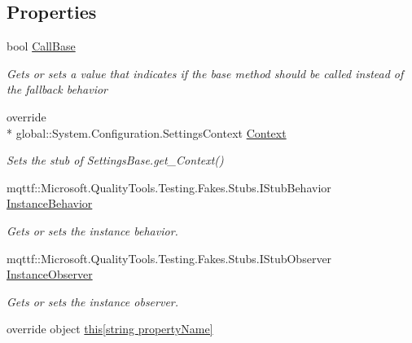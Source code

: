 \subsection*{Properties}
\begin{DoxyCompactItemize}
\item 
bool \hyperlink{class_system_1_1_configuration_1_1_fakes_1_1_stub_settings_base_a5e6f77066f1b9b35051130f2797a5ac5}{Call\-Base}
\begin{DoxyCompactList}\small\item\em Gets or sets a value that indicates if the base method should be called instead of the fallback behavior\end{DoxyCompactList}\item 
override \\*
global\-::\-System.\-Configuration.\-Settings\-Context \hyperlink{class_system_1_1_configuration_1_1_fakes_1_1_stub_settings_base_a3e1811dd1d27f7d4c11fbad319ac5613}{Context}
\begin{DoxyCompactList}\small\item\em Sets the stub of Settings\-Base.\-get\-\_\-\-Context()\end{DoxyCompactList}\item 
mqttf\-::\-Microsoft.\-Quality\-Tools.\-Testing.\-Fakes.\-Stubs.\-I\-Stub\-Behavior \hyperlink{class_system_1_1_configuration_1_1_fakes_1_1_stub_settings_base_a6afcb7bc15b19e7b93850309828bb37b}{Instance\-Behavior}
\begin{DoxyCompactList}\small\item\em Gets or sets the instance behavior.\end{DoxyCompactList}\item 
mqttf\-::\-Microsoft.\-Quality\-Tools.\-Testing.\-Fakes.\-Stubs.\-I\-Stub\-Observer \hyperlink{class_system_1_1_configuration_1_1_fakes_1_1_stub_settings_base_a2168de50e811a8fe9ba458c95aab3583}{Instance\-Observer}
\begin{DoxyCompactList}\small\item\em Gets or sets the instance observer.\end{DoxyCompactList}\item 
override object \hyperlink{class_system_1_1_configuration_1_1_fakes_1_1_stub_settings_base_aa3c6d027c46a09cebc0e32fcc5739575}{this\mbox{[}string property\-Name\mbox{]}}

\end{DoxyCompactItemize}
